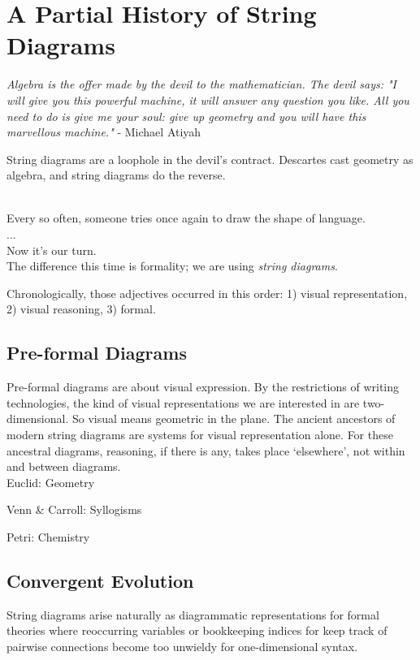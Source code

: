 \section{A Partial History of String Diagrams}

\emph{Algebra is the offer made by the devil to the mathematician. The devil says: "I will give you this powerful machine, it will answer any question you like. All you need to do is give me your soul: give up geometry and you will have this marvellous machine."} - Michael Atiyah

String diagrams are a loophole in the devil's contract. Descartes cast geometry as algebra, and string diagrams do the reverse.

\\
Every so often, someone tries once again to draw the shape of language.\\
...\\
Now it's our turn.\\
The difference this time is formality; we are using \emph{string diagrams}.

 Chronologically, those adjectives occurred in this order: 1) visual representation, 2) visual reasoning, 3) formal.

\subsection{Pre-formal Diagrams}

Pre-formal diagrams are about visual expression. By the restrictions of writing technologies, the kind of visual representations we are interested in are two-dimensional. So visual means geometric in the plane. The ancient ancestors of modern string diagrams are systems for visual representation alone. For these ancestral diagrams, reasoning, if there is any, takes place `elsewhere', not within and between diagrams.\\

Euclid: Geometry

Venn \& Carroll: Syllogisms

Petri: Chemistry

\subsection{Convergent Evolution}

String diagrams arise naturally as diagrammatic representations for formal theories where reoccurring variables or bookkeeping indices for keep track of pairwise connections become too unwieldy for one-dimensional syntax.




